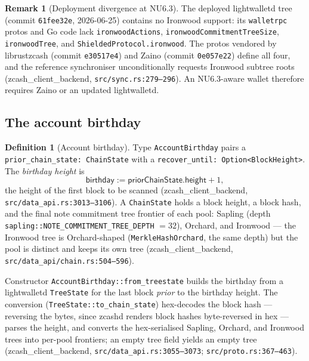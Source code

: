 \documentclass[11pt,a4paper]{article}
\theoremstyle{definition}
\newtheorem{definition}[theorem]{Definition}
\newtheorem{remark}[theorem]{Remark}
\begin{document}
\begin{remark}[Deployment divergence at NU6.3]\label{rem:sync-divergence}
The deployed \textsf{lightwalletd} tree (commit \texttt{61fee32e},
2026-06-25) contains no Ironwood support: its \texttt{walletrpc} protos and
Go code lack \texttt{ironwoodActions}, \texttt{ironwoodCommitmentTreeSize},
\texttt{ironwoodTree}, and \texttt{ShieldedProtocol.ironwood}. The protos
vendored by \textsf{librustzcash} (commit \texttt{e30517e4}) and
\textsf{Zaino} (commit \texttt{0e057e22}) define all four, and the reference
synchroniser unconditionally requests Ironwood subtree roots
(\textsf{zcash\_client\_backend}, \texttt{src/sync.rs:279--296}). An NU6.3-aware
wallet therefore requires Zaino or an updated lightwalletd.
\end{remark}

\subsection{The account birthday}\label{sec:sync-birthday}

\begin{definition}[Account birthday]\label{def:sync-birthday}
Type \texttt{AccountBirthday} pairs a \texttt{prior\_chain\_state:
ChainState} with a \texttt{recover\_until: Option<BlockHeight>}. The
\emph{birthday height} is
\[
\mathsf{birthday} := \mathsf{priorChainState.height} + 1,
\]
the height of the first block to be scanned
(\textsf{zcash\_client\_backend}, \texttt{src/data\_api.rs:3013--3106}). A
\texttt{ChainState} holds a block height, a block hash, and the final note
commitment tree frontier of each pool: Sapling (depth
\texttt{sapling::NOTE\_COMMITMENT\_TREE\_DEPTH} $= 32$), Orchard, and
Ironwood --- the Ironwood tree is Orchard-shaped
(\texttt{MerkleHashOrchard}, the same depth) but the pool is distinct and
keeps its own tree
(\textsf{zcash\_client\_backend}, \texttt{src/data\_api/chain.rs:504--596}).
\end{definition}

Constructor \texttt{AccountBirthday::from\_treestate} builds the birthday
from a lightwalletd \texttt{TreeState} for the last block \emph{prior} to
the birthday height. The conversion (\texttt{TreeState::to\_chain\_state})
hex-decodes the block hash --- reversing the bytes, since zcashd renders
block hashes byte-reversed in hex --- parses the height, and converts the
hex-serialised Sapling, Orchard, and Ironwood trees into per-pool
frontiers; an empty tree field yields an empty tree
(\textsf{zcash\_client\_backend}, \texttt{src/data\_api.rs:3055--3073};
\texttt{src/proto.rs:367--463}).
\end{document}
